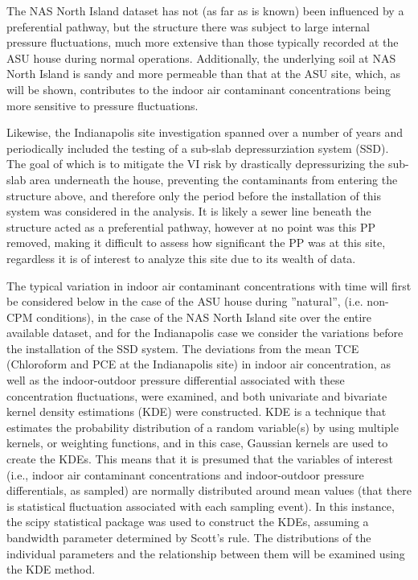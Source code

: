 \documentclass[journal=esthag,manuscript=article]{achemso}
\begin{document}
The NAS North Island dataset has not (as far as is known) been influenced by a preferential pathway, but the structure there was subject to large internal pressure fluctuations, much more extensive than those typically recorded at the ASU house during normal operations.
Additionally, the underlying soil at NAS North Island is sandy and more permeable than that at the ASU site, which, as will be shown, contributes to the indoor air contaminant concentrations being more sensitive to pressure fluctuations\cite{hosangadi_high-frequency_2017}. \par

Likewise, the Indianapolis site investigation spanned over a number of years and periodically included the testing of a sub-slab depressurziation system (SSD).
The goal of which is to mitigate the VI risk by drastically depressurizing the sub-slab area underneath the house, preventing the contaminants from entering the structure above, and therefore only the period before the installation of this system was considered in the analysis.
It is likely a sewer line beneath the structure acted as a preferential pathway\cite{mchugh_evidence_2017}, however at no point was this PP removed, making it difficult to assess how significant the PP was at this site, regardless it is of interest to analyze this site due to its wealth of data. \par

The typical variation in indoor air contaminant concentrations with time will first be considered below in the case of the ASU house during ”natural”, (i.e. non-CPM conditions), in the case of the NAS North Island site over the entire available dataset, and for the Indianapolis case we consider the variations before the installation of the SSD system.
The deviations from the mean TCE (Chloroform and PCE at the Indianapolis site) in indoor air concentration, as well as the indoor-outdoor pressure differential associated with these concentration fluctuations, were examined, and both univariate and bivariate kernel density estimations (KDE) were constructed.
KDE is a technique that estimates the probability distribution of a random variable(s) by using multiple kernels, or weighting functions, and in this case, Gaussian kernels are used to create the KDEs.
This means that it is presumed that the variables of interest (i.e., indoor air contaminant concentrations and indoor-outdoor pressure differentials, as sampled) are normally distributed around mean values (that there is statistical fluctuation associated with each sampling event). In this instance, the scipy statistical package was used to construct the KDEs, assuming a bandwidth parameter determined by Scott's rule.
The distributions of the individual parameters and the relationship between them will be examined using the KDE method.
\end{document}

